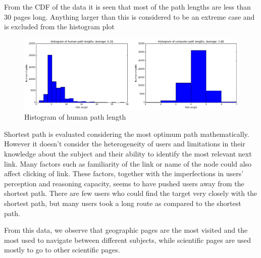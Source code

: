 \documentclass[11pt]{article}
\begin{document}
From the CDF of the data it is seen that most of the path lengths are less than 30 pages long. Anything larger than this is considered to be an extreme case and is excluded from the histogram plot

\begin{figure}
\includegraphics[scale=0.3]{Unknown-2.png}
\caption{Histogram of human path length}
\end{figure}

Shortest path is evaluated considering the most optimum path mathematically. However it doesn't consider the heterogeneity of users and limitations in their knowledge about the subject and their ability to identify the most relevant next link. Many factors such as familiarity of the link or name of the node could also affect clicking of link. These factors, together with the imperfections in users' perception and reasoning capacity, seems to have pushed users away from the shortest path. There are few users who could find the target very closely with the shortest path, but many users took a long route as compared to the shortest path.

From this data, we observe that geographic pages are the most visited and the most used to navigate between different subjects, while scientific pages are used mostly to go to other scientific pages. 
\end{document}
